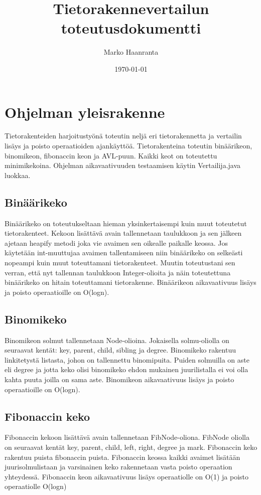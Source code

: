 \documentclass[11pt,a4paper]{article}
\author{Marko Haanranta}
\date{\today}
\title{Tietorakennevertailun toteutusdokumentti}
\begin{document}
\maketitle
\section{Ohjelman yleisrakenne}
Tietorakenteiden harjoitustyönä toteutin neljä eri tietorakennetta ja vertailin lisäys ja poisto operaatioiden ajankäyttöä. Tietorakenteina toteutin binäärikeon, binomikeon, fibonaccin keon ja AVL-puun. Kaikki keot on toteutettu minimikekoina. Ohjelman aikavaativuuden testaamisen käytin Vertailija.java luokkaa.
\subsection{Binäärikeko}
Binäärikeko on toteutukseltaan hieman yksinkertaisempi kuin muut toteutetut tietorakenteet. Kekoon lisättävä avain tallennetaan taulukkoon ja sen jälkeen ajetaan heapify metodi joka vie avaimen sen oikealle paikalle keossa. Jos käytetään int-muuttujaa avaimen tallentamiseen niin binäärikeko on selkeästi nopeampi kuin muut toteuttamani tietorakenteet. Muutin toteutustani sen verran, että nyt tallennan taulukkoon Integer-olioita ja näin toteutettuna binäärikeko on hitain toteuttamani tietorakenne. Binäärikeon aikavaativuus lisäys ja poisto operaatioille on O(logn).
\subsection{Binomikeko}
Binomikeon solmut tallennetaan Node-olioina. Jokaisella solmu-oliolla on seuraavat kentät: key, parent, child, sibling ja degree. Binomikeko rakentuu linkitetystä listasta, johon on tallennettu binomipuita. Puiden solmuilla on aste eli degree ja jotta keko olisi binomikeko ehdon mukainen juurilistalla ei voi olla kahta puuta joilla on sama aste. Binomikeon aikavaativuus lisäys ja poisto operaatioille on O(logn).
\subsection{Fibonaccin keko}
Fibonaccin kekoon lisättävä avain tallennetaan FibNode-oliona. FibNode oliolla on seuraavat kentät key, parent, child, left, right, degree ja mark. Fibonaccin keko rakentuu puista fibonaccin puista. Fibonaccin keossa kaikki avaimet lisätään juurisolmulistaan ja varsinainen keko rakennetaan vasta poisto operaation yhteydessä. Fibonaccin keon aikavaativuus lisäys operaatiolle on O(1) ja poisto operaatiolle O(logn)
\end{document}
